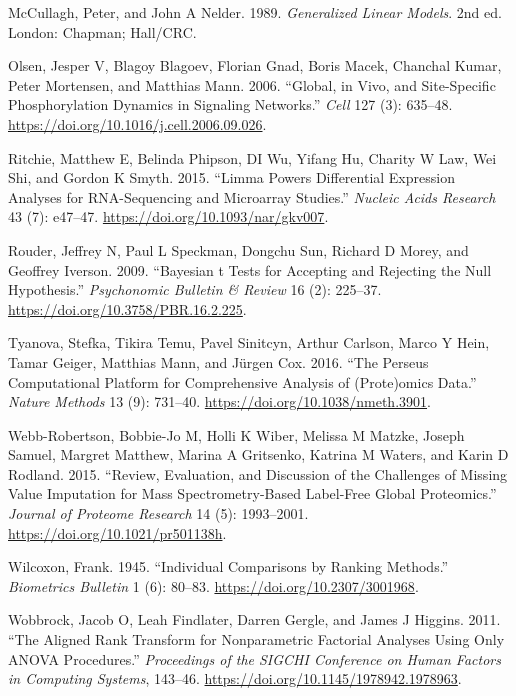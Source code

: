 \documentclass[
]{article}
\newlength{\cslhangindent}
\newenvironment{CSLReferences}[2] %
 {\begin{list}{}{%
  \setlength{\itemindent}{0pt}
  \setlength{\leftmargin}{0pt}
  \setlength{\parsep}{0pt}
  \ifodd #1
   \setlength{\leftmargin}{\cslhangindent}
   \setlength{\itemindent}{-1\cslhangindent}
  \fi
  \setlength{\itemsep}{#2\baselineskip}}}
 {\end{list}}
\begin{document}
\begin{CSLReferences}{1}{0}
McCullagh, Peter, and John A Nelder. 1989. \emph{Generalized Linear
Models}. 2nd ed. London: Chapman; Hall/CRC.

Olsen, Jesper V, Blagoy Blagoev, Florian Gnad, Boris Macek, Chanchal
Kumar, Peter Mortensen, and Matthias Mann. 2006. {``Global, in Vivo, and
Site-Specific Phosphorylation Dynamics in Signaling Networks.''}
\emph{Cell} 127 (3): 635--48.
\url{https://doi.org/10.1016/j.cell.2006.09.026}.

Ritchie, Matthew E, Belinda Phipson, DI Wu, Yifang Hu, Charity W Law,
Wei Shi, and Gordon K Smyth. 2015. {``Limma Powers Differential
Expression Analyses for RNA-Sequencing and Microarray Studies.''}
\emph{Nucleic Acids Research} 43 (7): e47--47.
\url{https://doi.org/10.1093/nar/gkv007}.

Rouder, Jeffrey N, Paul L Speckman, Dongchu Sun, Richard D Morey, and
Geoffrey Iverson. 2009. {``Bayesian t Tests for Accepting and Rejecting
the Null Hypothesis.''} \emph{Psychonomic Bulletin \& Review} 16 (2):
225--37. \url{https://doi.org/10.3758/PBR.16.2.225}.

Tyanova, Stefka, Tikira Temu, Pavel Sinitcyn, Arthur Carlson, Marco Y
Hein, Tamar Geiger, Matthias Mann, and Jürgen Cox. 2016. {``The Perseus
Computational Platform for Comprehensive Analysis of (Prote)omics
Data.''} \emph{Nature Methods} 13 (9): 731--40.
\url{https://doi.org/10.1038/nmeth.3901}.

Webb-Robertson, Bobbie-Jo M, Holli K Wiber, Melissa M Matzke, Joseph
Samuel, Margret Matthew, Marina A Gritsenko, Katrina M Waters, and Karin
D Rodland. 2015. {``Review, Evaluation, and Discussion of the Challenges
of Missing Value Imputation for Mass Spectrometry-Based Label-Free
Global Proteomics.''} \emph{Journal of Proteome Research} 14 (5):
1993--2001. \url{https://doi.org/10.1021/pr501138h}.

Wilcoxon, Frank. 1945. {``Individual Comparisons by Ranking Methods.''}
\emph{Biometrics Bulletin} 1 (6): 80--83.
\url{https://doi.org/10.2307/3001968}.

Wobbrock, Jacob O, Leah Findlater, Darren Gergle, and James J Higgins.
2011. {``The Aligned Rank Transform for Nonparametric Factorial Analyses
Using Only ANOVA Procedures.''} \emph{Proceedings of the SIGCHI
Conference on Human Factors in Computing Systems}, 143--46.
\url{https://doi.org/10.1145/1978942.1978963}.

\end{CSLReferences}
\end{document}
